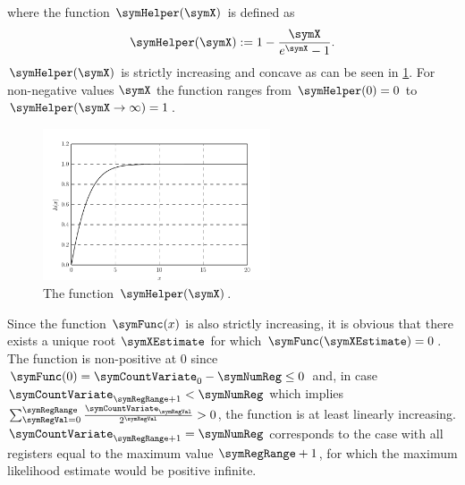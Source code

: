 \documentclass[a4paper]{scrartcl}
\begin{document}
where the function $\symHelper(\symX)$ is defined as
\begin{equation}
\label{equ:helper}
\symHelper(\symX):=1-\frac{\symX}{e^{\symX}-1}.
\end{equation}
$\symHelper(\symX)$ is strictly increasing and concave as can be seen in \cref{fig:helper_function}. For non-negative values $\symX$ the function ranges from $\symHelper(0)=0$ to $\symHelper(\symX\rightarrow \infty)=1$.
\begin{figure}
\centering
\includegraphics[width=0.6\textwidth]{helper}
\caption{The function $\symHelper(\symX)$.}
\label{fig:helper_function}
\end{figure}
Since the function $\symFunc(x)$ is also strictly increasing, it is obvious that there exists a unique root $\symXEstimate$ for which $\symFunc(\symXEstimate)=0$. The function is non-positive at 0 since $\symFunc(0)=\symCountVariate_0-\symNumReg\leq 0$ and, in case $\symCountVariate_{\symRegRange+1}<\symNumReg$ which implies $\sum_{\symRegVal=0}^\symRegRange \frac{\symCountVariate_\symRegVal}{2^\symRegVal}>0$, the function is at least linearly increasing. $\symCountVariate_{\symRegRange+1}=\symNumReg$ corresponds to the case with all registers equal to the maximum value $\symRegRange+1$, for which the maximum likelihood estimate would be positive infinite.
\end{document}
